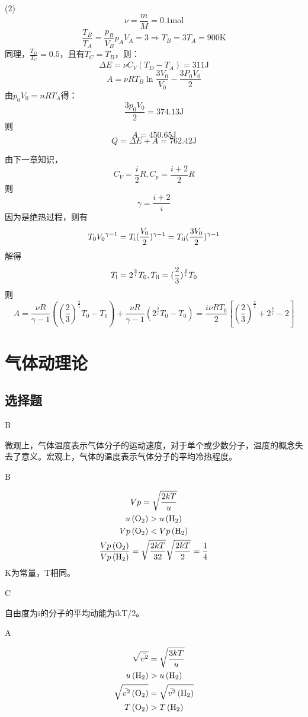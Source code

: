 \documentclass[b5paper,opensource]{./template/qyxf-book}
\newcommand{\RNum}[1]{\uppercase\expandafter{\romannumeral #1\relax}}%
\begin{document}
(2)%
\[\nu  = \frac{m}{M} = 0.1\mathrm{mol}\]
\[\frac{T_B}{T_A}=\frac{p_B}{V_B}{p_A}{V_A} = 3 \Rightarrow {T_B} = 3{T_A} = 900\mathrm{K}\]
同理，$\frac{T_D}{T_C}=0.5$，且有$T_C=T_B$，则：
\[\Delta E =\nu {C_V}({T_D}-{T_A})= 311\mathrm{J}\]
\[A =\nu R{T_B}\ln \frac{3{V_0}}{V_0}-\frac{{3P_0V_0}}{2}\]
由${p_0}{V_0} = nR{T_A}$得：
\[\frac{{3{p_0}{V_0}}}{2} = 374.13\mathrm{J}\]
则\[A = 450.65\mathrm{J}\]
\[Q = \Delta E+A = 762.42\mathrm{J}\]

\solve 由下一章知识，\[{C_V} = \frac{i}{2}R,{C_p} = \frac{{i + 2}}{2}R\]
则
\[\gamma=\frac{{i + 2}}{i}\]
因为是绝热过程，则有
\[{T_0}{V_0}^{\gamma-1}={T_\text{\RNum{1}}}{(\frac{V_0}{2})^{\gamma-1}}= {T_\text{\RNum{2}}}{(\frac{{3{V_0}}}{2})^{\gamma-1}}\]
解得
\[{T_\text{\RNum{1}}} = {2^{\frac{2}{i}}}{T_0},{T_\text{\RNum{2}}} = {(\frac{2}{3})^{\frac{2}{i}}}{T_0}\]
则
\[A = \frac{{\nu R}}{{\gamma-1}}({(\frac{2}{3})^{\frac{2}{i}}}{T_0} - {T_0}) + \frac{{\nu R}}{{\gamma  - 1}}({2^{\frac{2}{i}}}{T_0}-{T_0}) = \frac{{i\nu R{T_0}}}{2}[{(\frac{2}{3})^{\frac{2}{i}}} + {2^{\frac{2}{i}}} - 2]\]

\chapter{气体动理论}
\section{选择题}
B

\solve 微观上，气体温度表示气体分子的运动速度，对于单个或少数分子，温度的概念失去了意义。宏观上，气体的温度表示气体分子的平均冷热程度。

B

\solve
\begin{gather*} 
{Vp=\sqrt{\frac{2kT}{u}}}\\
{u\left(\ce{O2}\right)}>u\left(\ce{H2}\right)\\
{Vp\left(\ce{O2}\right)<Vp\left(\ce{H2}\right) } \\
\frac{Vp\left(\ce{O2}\right)}{Vp\left(\ce{H2}\right)}=\sqrt{\frac{2kT}{32}} \sqrt{\frac{2kT}{2}}=\frac{1}{4}%
\end{gather*}
K为常量，T相同。

C

\solve 自由度为i的分子的平均动能为ikT/2。

A

\solve

$$
\begin{aligned} \sqrt {\bar{v^{2}}} &=\sqrt{\frac{3kT}{u}} \\
u\left(\ce{H2}\right)& > u\left(\ce{H2}\right) \\
\sqrt {\bar{v^{2}}\left(\ce{O2}\right)}& = \sqrt {\bar{v^{2}}\left(\ce{H2}\right) }\\
T\left(\ce{O2}\right)&>T\left(\ce{H2}\right) 
\end{aligned}
$$
\end{document}
